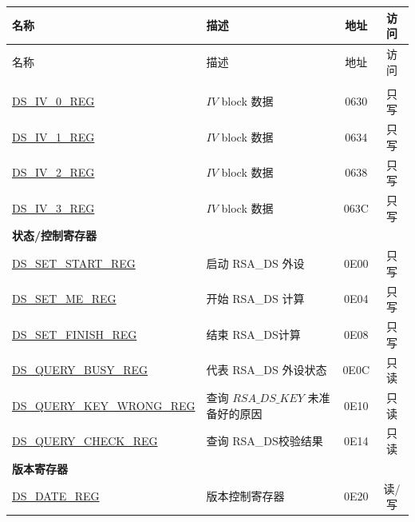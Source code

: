 


\begin{longtable}{ | p{5.2cm} | p{6.6cm} | c| c| }
\hline\rowcolor{lightgray}
名称 & 描述 &  地址 & 访问 \\ \hline
\endfirsthead
        \hline
        \rowcolor{lightgray}
名称 & 描述 &  地址 & 访问 \\ \hline

        \endhead
        \endfoot
\multicolumn{4}{|l|}{\textbf{配置寄存器}} \\ \hline
\hyperref[regdesc:DSIVREG]{DS\_IV\_0\_REG}               & \begin{math}IV\end{math} block 数据         & \hexprefix{}0630 & 只写 \\ \hline
\hyperref[regdesc:DSIVREG]{DS\_IV\_1\_REG}               & \begin{math}IV\end{math} block 数据          & \hexprefix{}0634 & 只写 \\ \hline
\hyperref[regdesc:DSIVREG]{DS\_IV\_2\_REG}               & \begin{math}IV\end{math} block 数据          & \hexprefix{}0638 & 只写 \\ \hline
\hyperref[regdesc:DSIVREG]{DS\_IV\_3\_REG}               & \begin{math}IV\end{math} block 数据           & \hexprefix{}063C & 只写 \\ \hline
\multicolumn{4}{|l|}{\textbf{状态/控制寄存器}} \\ \hline
\hyperref[regdesc:DSSETSTARTREG]{DS\_SET\_START\_REG}               & 启动 RSA\_DS 外设     & \hexprefix{}0E00 & 只写 \\ \hline
\hyperref[regdesc:DSSETMEREG]{DS\_SET\_ME\_REG}                     & 开始 RSA\_DS 计算       & \hexprefix{}0E04 & 只写 \\ \hline
\hyperref[regdesc:DSSETFINISHREG]{DS\_SET\_FINISH\_REG}             & 结束 RSA\_DS计算         & \hexprefix{}0E08 & 只写 \\ \hline
\hyperref[regdesc:DSQUERYBUSYREG]{DS\_QUERY\_BUSY\_REG}             & 代表 RSA\_DS 外设状态 & \hexprefix{}0E0C & 只读 \\ \hline
\hyperref[regdesc:DSQUERYKEYWRONGREG]{DS\_QUERY\_KEY\_WRONG\_REG}   & 查询 \begin{math}RSA\_DS\_KEY\end{math} 未准备好的原因       & \hexprefix{}0E10 & 只读 \\ \hline
\hyperref[regdesc:DSQUERYCHECKREG]{DS\_QUERY\_CHECK\_REG}           & 查询 RSA\_DS校验结果    & \hexprefix{}0E14 & 只读 \\ \hline
\multicolumn{4}{|l|}{\textbf{版本寄存器}} \\ \hline
\hyperref[regdesc:DSDATEREG]{DS\_DATE\_REG}                   & 版本控制寄存器   & \hexprefix{}0E20 & 读/写 \\ \hline
\end{longtable}
